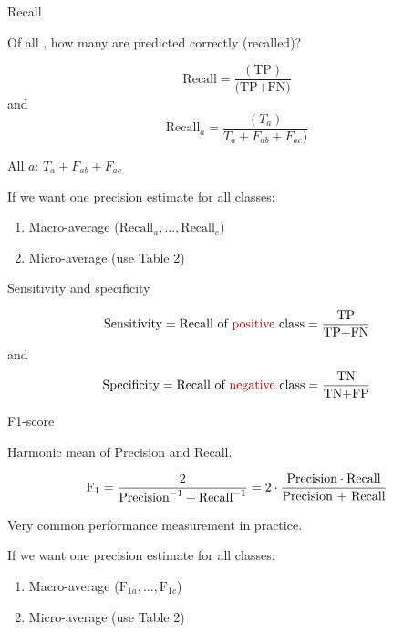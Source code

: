 \documentclass[10pt]{beamer}
\begin{document}
\begin{frame}{Recall}

Of all , how many are predicted correctly (recalled)?\pause

\[
\text{Recall} = \frac{(\text{TP})}{\text{(TP+FN)}}
\]
and
\[
\text{Recall}_a =  \frac{(T_a)}{T_a + F_{ab} + F_{ac})}
\]

All  $a$: $T_a + F_{ab} + F_{ac}$

If we want one precision estimate for all classes:
\begin{enumerate}
\item Macro-average ($\text{Recall}_a, ..., \text{Recall}_c$)
\item Micro-average (use Table 2)
\end{enumerate}



\end{frame}

\begin{frame}{Sensitivity and specificity}

\[
\text{Sensitivity} = \text{Recall of \uured{positive} class} =  \frac{\text{TP}}{\text{TP+FN}}
\]
and
\[
\text{Specificity} = \text{Recall of \uured{negative} class} =\frac{\text{TN}}{\text{TN+FP}}
\]

\end{frame}


\begin{frame}{F1-score}

Harmonic mean of Precision and Recall.

\[
\text{F}_1 = \frac{2}{\text{Precision}^{-1} + \text{Recall}^{-1}} = 2 \cdot \frac{\text{Precision} \cdot \text{Recall}}{\text{\text{Precision} + \text{Recall}}}
\]

Very common performance measurement in practice.

If we want one precision estimate for all classes:
\begin{enumerate}
\item Macro-average ($\text{F}_{1a}, ..., \text{F}_{1c}$)
\item Micro-average (use Table 2)
\end{enumerate}

\end{frame}
\end{document}
